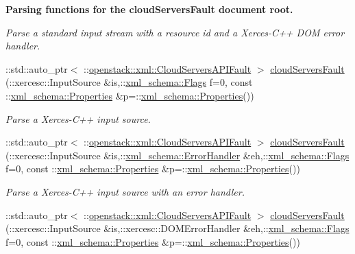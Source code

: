 \begin{Indent}{\bf Parsing functions for the cloudServersFault document root.}
\begin{DoxyCompactItemize}
\begin{DoxyCompactList}\small\item\em Parse a standard input stream with a resource id and a Xerces-\/C++ DOM error handler. \item\end{DoxyCompactList}\item 
::std::auto\_\-ptr$<$ ::\hyperlink{classopenstack_1_1xml_1_1CloudServersAPIFault}{openstack::xml::CloudServersAPIFault} $>$ \hyperlink{namespaceopenstack_1_1xml_a3fe572af490498884910e6bb2f2fc686}{cloudServersFault} (::xercesc::InputSource \&is,::\hyperlink{namespacexml__schema_affb4c227cbd9aa7453dd1dc5a1401943}{xml\_\-schema::Flags} f=0, const ::\hyperlink{namespacexml__schema_ad27ce19a7ee1d3b1064092648898f64c}{xml\_\-schema::Properties} \&p=::\hyperlink{namespacexml__schema_ad27ce19a7ee1d3b1064092648898f64c}{xml\_\-schema::Properties}())
\begin{DoxyCompactList}\small\item\em Parse a Xerces-\/C++ input source. \item\end{DoxyCompactList}\item 
::std::auto\_\-ptr$<$ ::\hyperlink{classopenstack_1_1xml_1_1CloudServersAPIFault}{openstack::xml::CloudServersAPIFault} $>$ \hyperlink{namespaceopenstack_1_1xml_a6317e89dbc049c93fca6a0b77c7fa2a0}{cloudServersFault} (::xercesc::InputSource \&is,::\hyperlink{namespacexml__schema_ab1c9361bfd3b404eaabf0c31eded79dc}{xml\_\-schema::ErrorHandler} \&eh,::\hyperlink{namespacexml__schema_affb4c227cbd9aa7453dd1dc5a1401943}{xml\_\-schema::Flags} f=0, const ::\hyperlink{namespacexml__schema_ad27ce19a7ee1d3b1064092648898f64c}{xml\_\-schema::Properties} \&p=::\hyperlink{namespacexml__schema_ad27ce19a7ee1d3b1064092648898f64c}{xml\_\-schema::Properties}())
\begin{DoxyCompactList}\small\item\em Parse a Xerces-\/C++ input source with an error handler. \item\end{DoxyCompactList}\item 
::std::auto\_\-ptr$<$ ::\hyperlink{classopenstack_1_1xml_1_1CloudServersAPIFault}{openstack::xml::CloudServersAPIFault} $>$ \hyperlink{namespaceopenstack_1_1xml_aca989ee34e9fc883a220e0131bade00f}{cloudServersFault} (::xercesc::InputSource \&is,::xercesc::DOMErrorHandler \&eh,::\hyperlink{namespacexml__schema_affb4c227cbd9aa7453dd1dc5a1401943}{xml\_\-schema::Flags} f=0, const ::\hyperlink{namespacexml__schema_ad27ce19a7ee1d3b1064092648898f64c}{xml\_\-schema::Properties} \&p=::\hyperlink{namespacexml__schema_ad27ce19a7ee1d3b1064092648898f64c}{xml\_\-schema::Properties}())

\end{DoxyCompactItemize}
\end{Indent}
